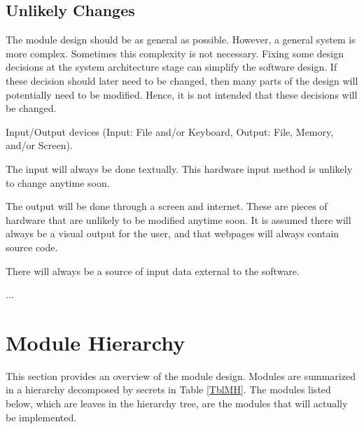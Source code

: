 \documentclass[12pt, titlepage]{article}
\newcounter{ucnum}
\newcommand{\uctheucnum}{UC\theucnum}
\begin{document}
\subsection{Unlikely Changes} \label{SecUchange}
The module design should be as general as possible. However, a general system is
more complex. Sometimes this complexity is not necessary. Fixing some design
decisions at the system architecture stage can simplify the software design. If
these decision should later need to be changed, then many parts of the design
will potentially need to be modified. Hence, it is not intended that these
decisions will be changed.
\begin{description}
\item[ \uctheucnum \label{ucIO}:] Input/Output devices
  (Input: File and/or Keyboard, Output: File, Memory, and/or Screen).

The input will always be done textually. This hardware input method is unlikely to change anytime soon.

The output will be done through a screen and internet. These are pieces of hardware that are unlikely to be modified anytime soon. It is assumed there will always be a visual output for the user, and that webpages will always contain source code.
\item[ \uctheucnum \label{ucInput}:] There will always be
  a source of input data external to the software.
\item ...
\end{description}
\section{Module Hierarchy} \label{SecMH}
This section provides an overview of the module design. Modules are summarized
in a hierarchy decomposed by secrets in Table \ref{TblMH}. The modules listed
below, which are leaves in the hierarchy tree, are the modules that will
actually be implemented.
\end{document}
